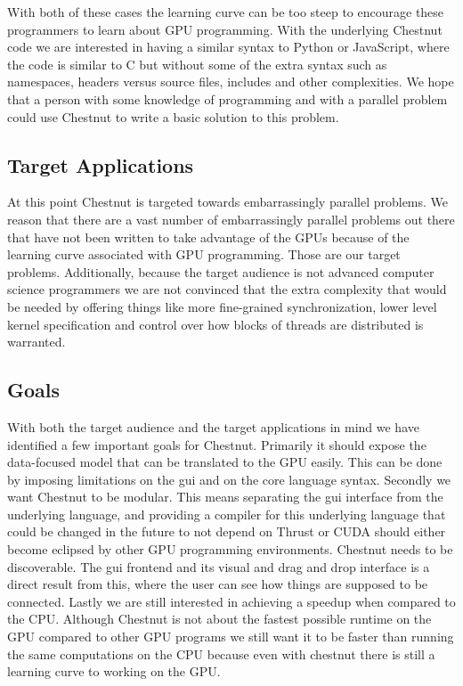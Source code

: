 \documentclass[twocolumn]{article}
\renewcommand{\|}{\origbar} %
\begin{document}
With both of these cases the learning curve can be too steep to encourage these programmers to learn about GPU programming. With the underlying Chestnut code we are interested in having a similar syntax to Python or JavaScript, where the code is similar to C but without some of the extra syntax such as namespaces, headers versus source files, includes and other complexities. We hope that a person with some knowledge of programming and with a parallel problem could use Chestnut to write a basic solution to this problem.

\subsection{Target Applications}

At this point Chestnut is targeted towards embarrassingly parallel problems. We reason that there are a vast number of embarrassingly parallel problems out there that have not been written to take advantage of the GPUs because of the learning curve associated with GPU programming. Those are our target problems. Additionally, because the target audience is not advanced computer science programmers we are not convinced that the extra complexity that would be needed by offering things like more fine-grained synchronization, lower level kernel specification and control over how blocks of threads are distributed is warranted.

\subsection{Goals}

With both the target audience and the target applications in mind we have identified a few important goals for Chestnut. Primarily it should expose the data-focused model that can be translated to the GPU easily. This can be done by imposing limitations on the gui and on the core language syntax. Secondly we want Chestnut to be modular. This means separating the gui interface from the underlying language, and providing a compiler for this underlying language that could be changed in the future to not depend on Thrust or CUDA should either become eclipsed by other GPU programming environments. Chestnut needs to be discoverable. The gui frontend and its visual and drag and drop interface is a direct result from this, where the user can see how things are supposed to be connected. Lastly we are still interested in achieving a speedup when compared to the CPU. Although Chestnut is not about the fastest possible runtime on the GPU compared to other GPU programs we still want it to be faster than running the same computations on the CPU because even with chestnut there is still a learning curve to working on the GPU.
\end{document}
